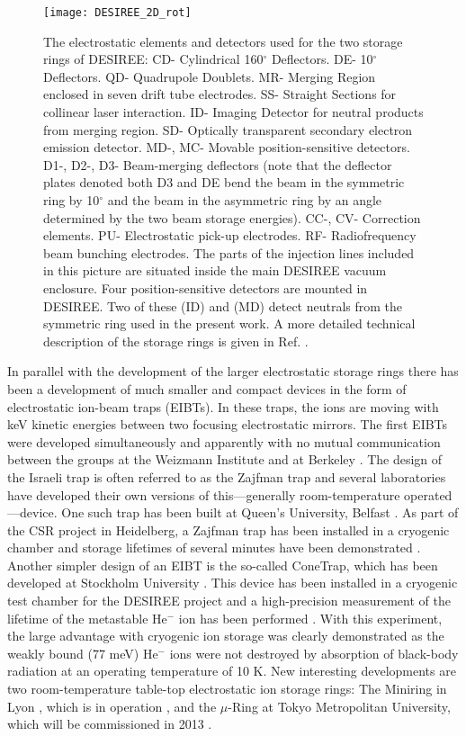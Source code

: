 \documentclass[aps,pra,preprint,superscriptaddress]{revtex4}
\begin{document}
\begin{figure}
	\centering
		\texttt{[image: DESIREE\_2D\_rot]}
	\caption{The electrostatic elements and detectors used for the two storage rings of DESIREE: CD- Cylindrical 160$^{\circ}$  Deflectors. DE- 10$^{\circ}$ Deflectors. QD- Quadrupole Doublets. MR- Merging Region enclosed in seven drift tube electrodes. SS- Straight Sections for collinear laser interaction. ID- Imaging Detector for neutral products from merging region. SD- Optically transparent secondary electron emission detector. MD-, MC- Movable position-sensitive detectors. D1-, D2-, D3- Beam-merging deflectors (note that the deflector plates denoted both D3 and DE bend the beam in the symmetric ring by 10$^{\circ}$ and the beam in the asymmetric ring by an angle determined by the two beam storage energies). CC-, CV- Correction elements. PU- Electrostatic pick-up electrodes. RF- Radiofrequency beam bunching electrodes.
	The parts of the injection lines included in this picture are situated inside the main DESIREE vacuum enclosure. Four position-sensitive detectors are mounted in DESIREE. Two of these (ID) and (MD) detect neutrals from the symmetric ring used in the present work. A more detailed technical description of the storage rings is given in Ref. \cite{Tho11}.}
	\label{fig:desireeoutline}
\end{figure}

In parallel with the development of the larger electrostatic storage rings there has been a development of much smaller and compact devices in the form of electrostatic ion-beam traps (EIBTs). In these traps, the ions are moving with keV kinetic energies between two focusing electrostatic mirrors. The first EIBTs were developed simultaneously and apparently with no mutual communication between the groups at the Weizmann Institute \cite{Zaj97} and at Berkeley \cite{Ben97}. The design of the Israeli trap is often referred to as the Zajfman trap and several laboratories have developed their own versions of this---generally room-temperature operated---device. One such trap has been built at Queen's University, Belfast \cite{Ale09}. As part of the CSR project in Heidelberg, a Zajfman trap has been installed in a cryogenic chamber and storage lifetimes of several minutes have been demonstrated \cite{Lan10}. Another simpler design of an EIBT is the so-called ConeTrap, which has been developed at Stockholm University \cite{Sch01}. This device has been installed in a cryogenic test chamber for the DESIREE project and a high-precision measurement of the lifetime of the metastable He$^-$ ion has been performed \cite{Rei09}. With this experiment, the large advantage with cryogenic ion storage was clearly demonstrated as the weakly bound (77 meV) He$^-$ ions were not destroyed by absorption of black-body radiation at an operating temperature of 10 K. 
New interesting developments are two room-temperature table-top electrostatic ion storage rings: The Miniring in Lyon \cite{Ber08}, which is in operation \cite{Mar13}, and the $\mu$-Ring at Tokyo Metropolitan University, which will be commissioned in 2013 \cite{Shi13}.
\end{document}
